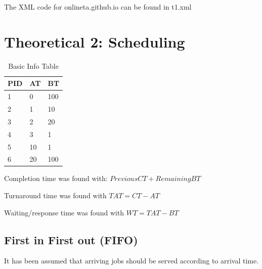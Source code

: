 \documentclass[11pt,a4paper]{article}
\theoremstyle{plain}
\theoremstyle{definition}
\theoremstyle{remark}
\numberwithin{equation}{section}
\begin{document}
The XML code for onlineta.github.io can be found in t1.xml




\section*{Theoretical 2: Scheduling}

\begin{table}[H]
	\centering
	\caption{Basic Info Table}
	\label{sch-basic}
	\begin{tabular}{lll}
		\hline
		\multicolumn{1}{|l|}{PID} & \multicolumn{1}{l|}{AT} & \multicolumn{1}{l|}{BT} \\ \hline
		1                         & 0                       & 100                     \\
		2                         & 1                       & 10                      \\
		3                         & 2                       & 20                      \\
		4                         & 3                       & 1                       \\
		5                         & 10                      & 1                       \\
		6                         & 20                      & 100                    
	\end{tabular}
\end{table}


Completion time was found with: $PreviousCT+RemainingBT$

Turnaround time was found with $TAT = CT-AT$

Waiting/response time was found with $WT = TAT-BT$


\subsection*{First in First out (FIFO)} %

It has been assumed that arriving jobs should be served according to arrival time.
\end{document}
